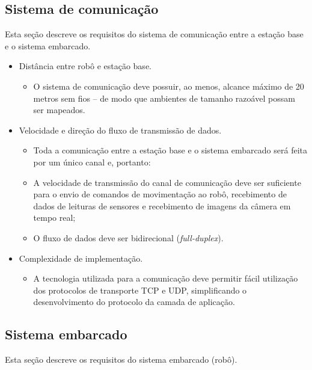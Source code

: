 \subsection{Sistema de comunicação}
Esta seção descreve os requisitos do sistema de comunicação entre a estação base e o sistema embarcado.

\begin{itemize} %

  \item Distância entre robô e estação base.
    \begin{itemize}
      \item O sistema de comunicação deve possuir, ao menos, alcance máximo de 20 metros sem fios -- de modo que ambientes de tamanho razoável possam ser mapeados.
    \end{itemize}

  \item Velocidade e direção do fluxo de transmissão de dados.
    \begin{itemize}
      \item Toda a comunicação entre a estação base e o sistema embarcado será feita por um único canal e, portanto:
      \item A velocidade de transmissão do canal de comunicação deve ser suficiente para o envio de comandos de movimentação ao robô, recebimento de dados de leituras de sensores e recebimento de imagens da câmera em tempo real; 
      \item O fluxo de dados deve ser bidirecional (\textit{full-duplex}).
    \end{itemize}

  \item Complexidade de implementação.
    \begin{itemize}
      \item A tecnologia utilizada para a comunicação deve permitir fácil utilização dos protocolos de transporte TCP e UDP, simplificando o desenvolvimento do protocolo da camada de aplicação.
    \end{itemize}

\end{itemize} %



\subsection{Sistema embarcado}
Esta seção descreve os requisitos do sistema embarcado (robô).

